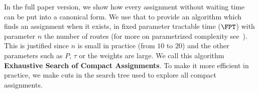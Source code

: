\documentclass[10pt, conference, letterpaper]{IEEEtran}
\newtheorem{proposition}{Proposition}
\begin{document}
In the full paper version, we show how every assignment without waiting time can be put into a canonical form.
We use that to provide an algorithm which finds an assignment when it exists, in fixed parameter tractable time ($\FPT$) with parameter $n$ the number of routes (for more on parametrized complexity see~\cite{downey2012parameterized}). This is justified since $n$ is small in practice (from $10$ to $20$) and the other parameters such as $P$, $\tau$ or the weights are large. We call this algorithm \textbf{Exhaustive Search of Compact Assignments}. To make it more efficient in practice, we make cuts in the search tree used to explore all compact assignments. 
%
% 
%
\end{document}
